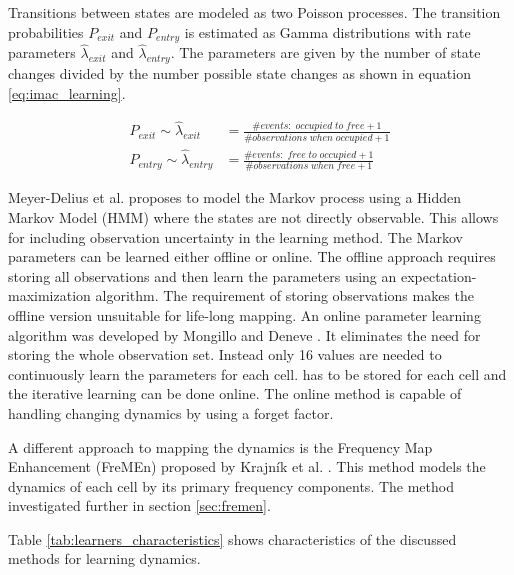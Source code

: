 Transitions between states are modeled as two Poisson processes. The transition probabilities $P_{exit}$ and $P_{entry}$ is estimated as Gamma distributions with rate parameters $\hat{\lambda}_{exit}$ and $\hat{\lambda}_{entry}$.
The parameters are given by the number of state changes divided by the number possible state changes as shown in equation \ref{eq:imac_learning}.

\begin{align}
	P_{exit} \sim \hat{\lambda}_{exit} &= \frac{\#events:\; occupied\; to\; free + 1}{\#observations\; when\; occupied + 1} \label{eq:imac_learning}\\
	P_{entry} \sim\hat{\lambda}_{entry} &= \frac{\#events:\; free\; to\; occupied + 1}{\#observations\; when\; free + 1}
	\nonumber
\end{align}


Meyer-Delius et al. \cite{Meyer-Delius2012} proposes to model the Markov process using a Hidden Markov Model (HMM) where the states are not directly observable.
This allows for  including observation uncertainty in the learning method.
The Markov parameters can be learned either offline or online.
The offline approach requires storing all observations and then learn the parameters using an expectation-maximization algorithm. 
The requirement of storing observations makes the offline version unsuitable for life-long mapping. 
An online parameter learning algorithm was developed by Mongillo and Deneve \cite{Mongillo2008}. 
It eliminates the need for storing the whole observation set. 
Instead only 16 values are needed to continuously learn the parameters for each cell. 
has to be stored for each cell and the iterative learning can be done online. 
The online method is capable of handling changing dynamics by using a forget factor. 

A different approach to mapping the dynamics is the Frequency Map Enhancement (FreMEn) proposed by Krajník et al. \cite{Krajnik2014}. This method models the dynamics of each cell by its primary frequency components.
The method investigated further in section \ref{sec:fremen}.

Table \ref{tab:learners_characteristics} shows characteristics of the discussed methods for learning dynamics. 

